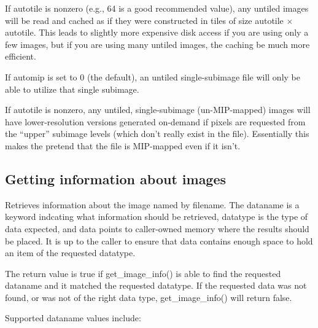 If {\cf autotile} is nonzero (e.g., 64 is a good recommended value), any
untiled images will be read and cached as if they were constructed in
tiles of size {\cf autotile} $\times$ {\cf autotile}.  This leads to
slightly more expensive disk access if you are using only a few
images, but if you are using many untiled images, the caching be much
more efficient.
\apiend

If {\cf automip} is set to 0 (the default), an untiled single-subimage
file will only be able to utilize that single subimage.

If {\cf autotile} is nonzero, any untiled, single-subimage
(un-MIP-mapped) images will have lower-resolution versions generated
on-demand if pixels are requested from the ``upper'' subimage levels
(which don't really exist in the file).  Essentially this makes the
\ImageCache pretend that the file is MIP-mapped even if it isn't.
\apiend


\newpage
\subsection{Getting information about images}
\label{sec:imagecache:api:getimageinfo}
\label{sec:imagecache:api:getimagespec}

Retrieves information about the image named by {\cf filename}.
The {\cf dataname} is a keyword indcating what information should
be retrieved, {\cf datatype} is the type of data expected, and
{\cf data} points to caller-owned memory where the results should be
placed.  It is up to the caller to ensure that {\cf data} contains
enough space to hold an item of the requested {\cf datatype}.

The return value is {\cf true} if {\cf get_image_info()} is able
to find the requested {\cf dataname} and it matched the requested
{\cf datatype}.  If the requested data was not found, or was not
of the right data type, {\cf get_image_info()} will return {\cf false}.

Supported {\cf dataname} values include:

